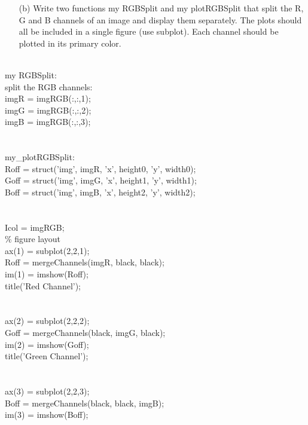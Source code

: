 \pagebreak
    \begin{enumerate}        
        \item[(b)] {Write two functions my RGBSplit and my plotRGBSplit that split the R, G and B channels of an image and display them separately. The plots should all be included in a single figure (use subplot). Each channel should be plotted in its primary color.}
    \end{enumerate}
        \raggedright{
        \\ my RGBSplit:
        \\ split the RGB channels:
        \\ imgR = imgRGB(:,:,1);
        \\ imgG = imgRGB(:,:,2);
        \\ imgB = imgRGB(:,:,3);
        \\ \ \\
        \\ my_plotRGBSplit:
        \\ Roff = struct('img', imgR, 'x', height0, 'y', width0);
        \\ Goff = struct('img', imgG, 'x', height1, 'y', width1);
        \\ Boff = struct('img', imgB, 'x', height2, 'y', width2);
        \\ \ \\
        \\ Icol = imgRGB;
        \\ \% figure layout
        \\ ax(1) = subplot(2,2,1);
        \\ Roff = mergeChannels(imgR, black, black);
        \\ im(1) = imshow(Roff);
        \\ title({'Red Channel'});
        \\ \ \\
        \\ ax(2) = subplot(2,2,2);
        \\ Goff = mergeChannels(black, imgG, black);
        \\ im(2) = imshow(Goff);
        \\ title({'Green Channel'});
        \\ \ \\
        \\ ax(3) = subplot(2,2,3);
        \\ Boff = mergeChannels(black, black, imgB);
        \\ im(3) = imshow(Boff);
}
